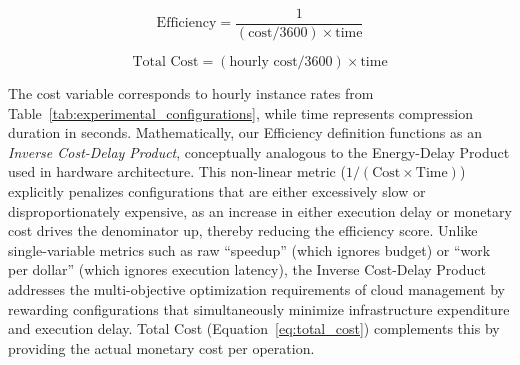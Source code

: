 \documentclass[conference]{IEEEtran}
\begin{document}
\begin{equation}
	\text{Efficiency} = \frac{1}{(\text{cost}/3600) \times \text{time}}
	\label{eq:efficiency}
\end{equation}

\begin{equation}
	\text{Total Cost} = (\text{hourly cost}/3600) \times \text{time}
	\label{eq:total_cost}
\end{equation}

The cost variable corresponds to hourly instance rates from
Table~\ref{tab:experimental_configurations}, while time represents compression
duration in seconds. Mathematically, our Efficiency definition functions as an
\textit{Inverse Cost-Delay Product}, conceptually analogous to the
Energy-Delay Product used in hardware architecture. This non-linear metric
($1 / (\text{Cost} \times \text{Time})$) explicitly penalizes configurations
that are either excessively slow or disproportionately expensive, as an
increase in either execution delay or monetary cost drives the denominator up,
thereby reducing the efficiency score. Unlike single-variable metrics such as
raw ``speedup'' (which ignores budget) or ``work per dollar'' (which ignores
execution latency), the Inverse Cost-Delay Product addresses the
multi-objective optimization requirements of cloud management by rewarding
configurations that simultaneously minimize infrastructure expenditure and
execution delay. Total Cost (Equation~\ref{eq:total_cost}) complements this by
providing the actual monetary cost per operation.
\end{document}
